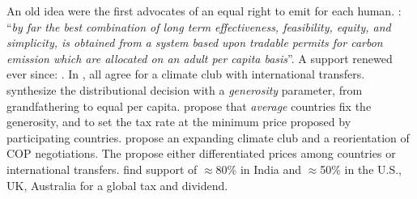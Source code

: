 \documentclass[aspectratio=169,xcolor=dvipsnames, 11pt,mathserif]{beamer}
\begin{document}
\begin{framefont}{\small}
\begin{frame}{An old idea}
    \bbvsp \ip {} were the first advocates of an equal right to emit for each human. 
    \ip {}: ``\textit{by far the best combination of long term effectiveness, feasibility, equity, and simplicity, is obtained from a system based upon tradable permits for carbon emission which are allocated on an adult per capita basis}''.
    \ip A support renewed ever since: . 
    \ip In , all agree for a climate club with international transfers.
    \ip {} synthesize the distributional decision with a \textit{generosity} parameter, from grandfathering to equal per capita. %
    \ip {} propose that \textit{average} countries fix the generosity, and to set the tax rate at the minimum price proposed by participating countries. %
    \ip {} propose an expanding climate club and a reorientation of COP negotiations. %
    \ip The  propose either differentiated prices among countries or international transfers. %
    \ip {} find support of $\approx$80\% in India and $\approx$50\% in the U.S., UK, Australia for a global tax and dividend.
    \ee
\end{frame}


\end{framefont}
\end{document}
